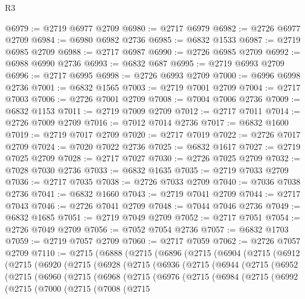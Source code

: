\begin{lexlean}{R3}
\begin{coremodule}
@6979 := @2719 @6977 @2709
@6980 := @2717 @6979
@6982 := @2726 @6977 @2709
@6984 := @6980 @6982 @2736
@6985 := @6832 @1533
@6987 := @2719 @6985 @2709
@6988 := @2717 @6987
@6990 := @2726 @6985 @2709
@6992 := @6988 @6990 @2736
@6993 := @6832 @687
@6995 := @2719 @6993 @2709
@6996 := @2717 @6995
@6998 := @2726 @6993 @2709
@7000 := @6996 @6998 @2736
@7001 := @6832 @1565
@7003 := @2719 @7001 @2709
@7004 := @2717 @7003
@7006 := @2726 @7001 @2709
@7008 := @7004 @7006 @2736
@7009 := @6832 @1153
@7011 := @2719 @7009 @2709
@7012 := @2717 @7011
@7014 := @2726 @7009 @2709
@7016 := @7012 @7014 @2736
@7017 := @6832 @1600
@7019 := @2719 @7017 @2709
@7020 := @2717 @7019
@7022 := @2726 @7017 @2709
@7024 := @7020 @7022 @2736
@7025 := @6832 @1617
@7027 := @2719 @7025 @2709
@7028 := @2717 @7027
@7030 := @2726 @7025 @2709
@7032 := @7028 @7030 @2736
@7033 := @6832 @1635
@7035 := @2719 @7033 @2709
@7036 := @2717 @7035
@7038 := @2726 @7033 @2709
@7040 := @7036 @7038 @2736
@7041 := @6832 @1660
@7043 := @2719 @7041 @2709
@7044 := @2717 @7043
@7046 := @2726 @7041 @2709
@7048 := @7044 @7046 @2736
@7049 := @6832 @1685
@7051 := @2719 @7049 @2709
@7052 := @2717 @7051
@7054 := @2726 @7049 @2709
@7056 := @7052 @7054 @2736
@7057 := @6832 @1703
@7059 := @2719 @7057 @2709
@7060 := @2717 @7059
@7062 := @2726 @7057 @2709
@7110 := @2715
    (@6888
      (@2715
        (@6896
          (@2715
            (@6904
              (@2715
                (@6912
                  (@2715
                    (@6920
                      (@2715
                        (@6928
                          (@2715
                            (@6936
                              (@2715
                                (@6944
                                  (@2715
                                    (@6952
                                      (@2715
                                        (@6960
                                          (@2715
                                            (@6968
                                              (@2715
                                                (@6976
                                                  (@2715
                                                    (@6984
                                                      (@2715
                                                        (@6992
                                                          (@2715
                                                            (@7000
                                                              (@2715
                                                                (@7008
                                                                  (@2715

\end{coremodule}
\end{lexlean}
